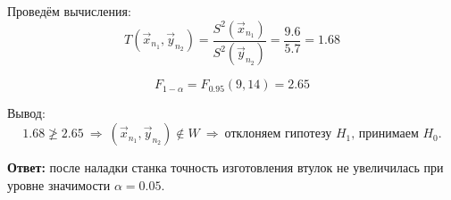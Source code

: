 Проведём вычисления:
\begin{equation*}
    T(\vec x_{n_1}, \vec y_{n_2}) = \frac{S^2(\vec x_{n_1})}{S^2(\vec y_{n_2})} = \frac{9.6}{5.7} = 1.68
 \end{equation*}

 \begin{equation*}
     F_{1 - \alpha} = F_{0.95}(9, 14) = 2.65
 \end{equation*}

 Вывод:
 \begin{equation*}
     1.68 \ngeq 2.65~ \Rightarrow ~ (\vec x_{n_1}, \vec y_{n_2}) \notin W ~
     \Rightarrow ~ \text{отклоняем гипотезу $H_1$, принимаем $H_0$.}
 \end{equation*}

 \textbf{Ответ:} после наладки станка точность изготовления втулок не увеличилась при уровне значимости $\alpha = 0.05$.
